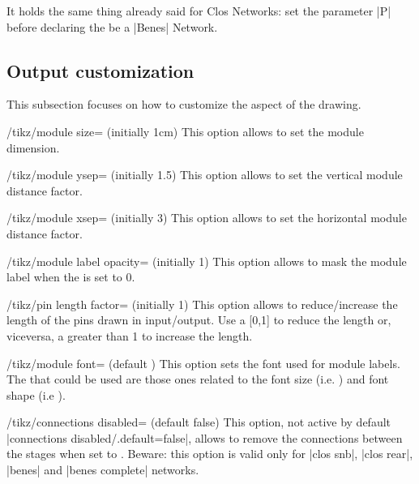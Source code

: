 \documentclass{ltxdoc} %
\begin{document}
It holds the same thing already said for Clos Networks: set the parameter |P| before declaring the  be a |Benes| Network.


\subsection{Output customization}
\label{subsec:customization}
This subsection focuses on how to customize the aspect of the drawing.

\begin{key}{/tikz/module size= (initially 1cm)}
    This option allows to set the module dimension.
\end{key}

\begin{key}{/tikz/module ysep= (initially 1.5)}
    This option allows to set the vertical module distance factor.
\end{key}

\begin{key}{/tikz/module xsep= (initially 3)}
    This option allows to set the horizontal module distance factor.
\end{key}

\begin{key}{/tikz/module label opacity= (initially 1)}
    This option allows to mask the module label when the  is set to 0.
\end{key}

\begin{key}{/tikz/pin length factor= (initially 1)}
    This option allows to reduce/increase the length of the pins drawn in input/output. Use a  [0,1] to reduce the length or, viceversa, a  greater than 1 to increase the length.
\end{key}

\begin{key}{/tikz/module font= (default )}
    This option sets the font used for module labels. The  that could be used are those ones related to the font size (i.e. ) and font shape (i.e ).
\end{key}

\begin{key}{/tikz/connections disabled= (default false)}
	This option, not active by default |connections disabled/.default=false|, allows to remove the connections between the stages when set to . Beware: this option is valid only for |clos snb|, |clos rear|, |benes| and |benes complete| networks.
\end{key}
\end{document}
